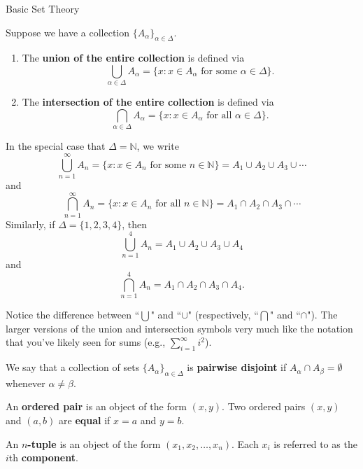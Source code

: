 \begin{section}{Basic Set Theory}
\begin{definition}
Suppose we have a collection $\{A_{\alpha}\}_{\alpha\in\Delta}$.

\begin{enumerate}
\item The \textbf{union of the entire collection} is defined via
\[
\bigcup_{\alpha\in\Delta} A_{\alpha}=\{x:x\in A_{\alpha} \mbox{ for some }\alpha\in \Delta\}.
\]

\item The \textbf{intersection of the entire collection} is defined via
\[
\bigcap_{\alpha\in\Delta} A_{\alpha}=\{x:x\in A_{\alpha} \mbox{ for all }\alpha\in \Delta\}.
\]
\end{enumerate}
\end{definition}

\begin{example} 
In the special case that $\Delta=\mathbb{N}$, we write
\[
\bigcup_{n=1}^{\infty}A_n= \{ x : x \in A_n \mbox{ for some } n \in \mathbb{N}\}= A_1\cup A_2 \cup A_3 \cup \cdots
\] 
and
\[
\bigcap_{n=1}^{\infty}A_n= \{ x : x \in A_n \mbox{ for all } n \in \mathbb{N}\} = A_1\cap A_2 \cap A_3 \cap \cdots
\] 
Similarly, if $\Delta=\{1,2,3,4\}$, then
\[
\bigcup_{n=1}^{4}A_n= A_1\cup A_2 \cup A_3 \cup A_4
\] 
and
\[
\bigcap_{n=1}^{4}A_n= A_1\cap A_2 \cap A_3 \cap A_4.
\] 
\end{example}

\begin{remark}
Notice the difference between ``$\bigcup$" and ``$\cup$" (respectively, ``$\bigcap$" and ``$\cap$").  The larger versions of the union and intersection symbols very much like the notation that you've likely seen for sums (e.g., $\displaystyle \sum_{i=1}^\infty i^2$).
\end{remark}

\begin{definition}
We say that a collection of sets $\{A_{\alpha}\}_{\alpha\in\Delta}$ is \textbf{pairwise disjoint} if $A_{\alpha} \cap A_{\beta}=\emptyset$ whenever $\alpha\neq \beta$.
\end{definition}

\begin{definition}
An \textbf{ordered pair} is an object of the form $(x,y)$. Two ordered pairs $(x,y)$ and $(a,b)$ are \textbf{equal} if $x=a$ and $y=b$. 
\end{definition}

\begin{definition}
An \textbf{$n$-tuple} is an object of the form $(x_1, x_2,\ldots,x_n)$.  Each $x_i$ is referred to as the $i$th \textbf{component}.
\end{definition}


\end{section}
